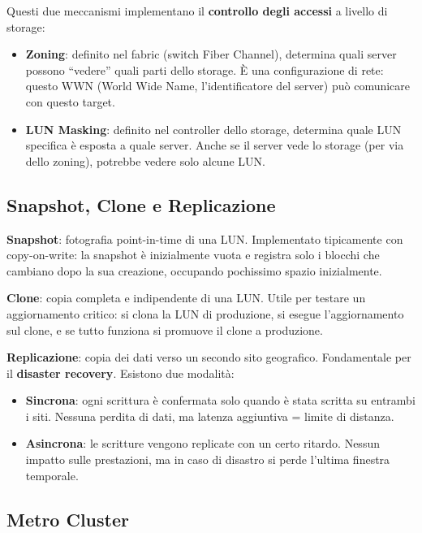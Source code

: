\documentclass[
  italian,
  openany]{book}
\providecommand{\tightlist}{%
  \setlength{\itemsep}{0pt}\setlength{\parskip}{0pt}}
\begin{document}
Questi due meccanismi implementano il \textbf{controllo degli accessi} a
livello di storage:

\begin{itemize}
\tightlist
\item
  \textbf{Zoning}: definito nel fabric (switch Fiber Channel), determina
  quali server possono ``vedere'' quali parti dello storage. È una
  configurazione di rete: questo WWN (World Wide Name, l'identificatore
  del server) può comunicare con questo target.
\item
  \textbf{LUN Masking}: definito nel controller dello storage, determina
  quale LUN specifica è esposta a quale server. Anche se il server vede
  lo storage (per via dello zoning), potrebbe vedere solo alcune LUN.
\end{itemize}

\subsection{Snapshot, Clone e
Replicazione}\label{snapshot-clone-e-replicazione}

\textbf{Snapshot}: fotografia point-in-time di una LUN. Implementato
tipicamente con copy-on-write: la snapshot è inizialmente vuota e
registra solo i blocchi che cambiano dopo la sua creazione, occupando
pochissimo spazio inizialmente.

\textbf{Clone}: copia completa e indipendente di una LUN. Utile per
testare un aggiornamento critico: si clona la LUN di produzione, si
esegue l'aggiornamento sul clone, e se tutto funziona si promuove il
clone a produzione.

\textbf{Replicazione}: copia dei dati verso un secondo sito geografico.
Fondamentale per il \textbf{disaster recovery}. Esistono due modalità:

\begin{itemize}
\tightlist
\item
  \textbf{Sincrona}: ogni scrittura è confermata solo quando è stata
  scritta su entrambi i siti. Nessuna perdita di dati, ma latenza
  aggiuntiva = limite di distanza.
\item
  \textbf{Asincrona}: le scritture vengono replicate con un certo
  ritardo. Nessun impatto sulle prestazioni, ma in caso di disastro si
  perde l'ultima finestra temporale.
\end{itemize}

\subsection{Metro Cluster}\label{metro-cluster}
\end{document}
